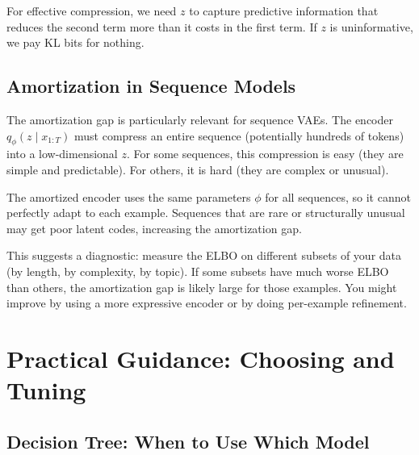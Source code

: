 \vspace{0.3cm}

For effective compression, we need $z$ to capture predictive information that reduces the second term more than it costs in the first term. If $z$ is uninformative, we pay KL bits for nothing.

\vspace{1.5em}

\subsection{Amortization in Sequence Models}

The amortization gap is particularly relevant for sequence VAEs. The encoder $q_\phi(z \mid x_{1:T})$ must compress an entire sequence (potentially hundreds of tokens) into a low-dimensional $z$. For some sequences, this compression is easy (they are simple and predictable). For others, it is hard (they are complex or unusual).

\vspace{0.3cm}

The amortized encoder uses the same parameters $\phi$ for all sequences, so it cannot perfectly adapt to each example. Sequences that are rare or structurally unusual may get poor latent codes, increasing the amortization gap.

\vspace{0.3cm}

This suggests a diagnostic: measure the ELBO on different subsets of your data (by length, by complexity, by topic). If some subsets have much worse ELBO than others, the amortization gap is likely large for those examples. You might improve by using a more expressive encoder or by doing per-example refinement.

\vspace{2em}

\section{Practical Guidance: Choosing and Tuning}
\label{sec:practical_guidance}

\vspace{1em}

\subsection{Decision Tree: When to Use Which Model}

